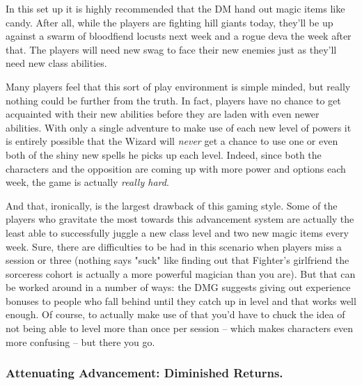 In this set up it is highly recommended that the DM hand out magic items like candy. After all, while the players are fighting hill giants today, they'll be up against a swarm of bloodfiend locusts next week and a rogue deva the week after that. The players will need new swag to face their new enemies just as they'll need new class abilities.

Many players feel that this sort of play environment is simple minded, but really nothing could be further from the truth. In fact, players have no chance to get acquainted with their new abilities before they are laden with even newer abilities. With only a single adventure to make use of each new level of powers it is entirely possible that the Wizard will \textit{never} get a chance to use one or even both of the shiny new spells he picks up each level. Indeed, since both the characters and the opposition are coming up with more power and options each week, the game is actually \textit{really hard}.

And that, ironically, is the largest drawback of this gaming style. Some of the players who gravitate the most towards this advancement system are actually the least able to successfully juggle a new class level and two new magic items every week. Sure, there are difficulties to be had in this scenario when players miss a session or three (nothing says "suck" like finding out that Fighter's girlfriend the sorceress cohort is actually a more powerful magician than you are). But that can be worked around in a number of ways: the DMG suggests giving out experience bonuses to people who fall behind until they catch up in level and that works well enough. Of course, to actually make use of that you'd have to chuck the idea of not being able to level more than once per session -- which makes characters even more confusing -- but there you go.

\subsubsection{Attenuating Advancement: Diminished Returns.}
\vspace*{-8pt}

